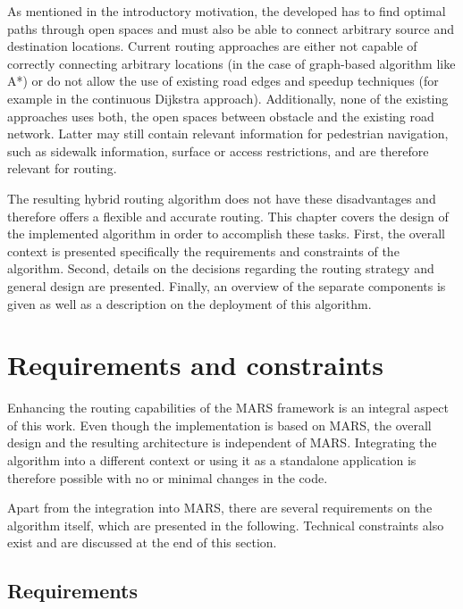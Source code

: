 
As mentioned in the introductory motivation, the developed  has to find optimal paths through open spaces and must also be able to connect arbitrary source and destination locations.
Current routing approaches are either not capable of correctly connecting arbitrary locations (in the case of graph-based algorithm like A*) or do not allow the use of existing road edges and speedup techniques (for example in the continuous Dijkstra approach).
Additionally, none of the existing approaches uses both, the open spaces between obstacle and the existing road network.
Latter may still contain relevant information for pedestrian navigation, such as sidewalk information, surface or access restrictions, and are therefore relevant for routing.

The resulting hybrid routing algorithm does not have these disadvantages and therefore offers a flexible and accurate routing.
This chapter covers the design of the implemented algorithm in order to accomplish these tasks.
First, the overall context is presented specifically the requirements and constraints of the algorithm.
Second, details on the decisions regarding the routing strategy and general design are presented.
Finally, an overview of the separate components is given as well as a description on the deployment of this algorithm.

\section{Requirements and constraints}
	
	Enhancing the routing capabilities of the MARS framework is an integral aspect of this work.
	Even though the implementation is based on MARS, the overall design and the resulting architecture is independent of MARS.
	Integrating the algorithm into a different context or using it as a standalone application is therefore possible with no or minimal changes in the code.
	
	Apart from the integration into MARS, there are several requirements on the algorithm itself, which are presented in the following.
	Technical constraints also exist and are discussed at the end of this section.
	
	\subsection{Requirements}
	
